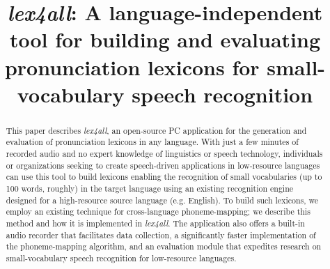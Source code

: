 \documentclass[11pt]{article}
\title{\textit{lex4all}: A language-independent tool for building and evaluating pronunciation lexicons for small-vocabulary speech recognition}
\date{}
\begin{document}
\maketitle

\begin{abstract}
This paper describes \textit{lex4all}, an open-source PC application for the generation and evaluation of pronunciation lexicons in any language. 
With just a few minutes of recorded audio and no expert knowledge of linguistics or speech technology, individuals or organizations seeking to create speech-driven applications in low-resource languages can use this tool to build  lexicons enabling 
the recognition of small vocabularies (up to 100 words, roughly) in the target language
using an existing recognition engine designed for a high-resource source language (e.g. English). 
To build such lexicons, we employ an existing technique for cross-language phoneme-mapping; 
we describe this method and how it is implemented in \textit{lex4all}.
The application also offers
a built-in audio recorder that facilitates data collection, 
a significantly faster implementation of the phoneme-mapping algorithm,
and an evaluation module that expedites research on small-vocabulary speech recognition for low-resource languages. 
\end{abstract}


%
\end{document}
